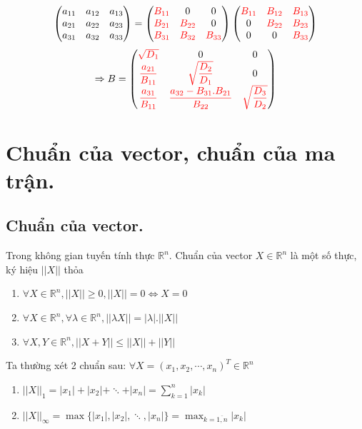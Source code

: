 \documentclass[12pt, a4paper]{report}
\begin{document}
\[
    \begin{pmatrix}
        a_{11} & a_{12} & a_{13} \\
        a_{21} & a_{22} & a_{23} \\
        a_{31} & a_{32} & a_{33} \\
    \end{pmatrix}  = \begin{pmatrix}
        \textcolor{red}{B_{11}} & 0 & 0 \\
        \textcolor{red}{B_{21}} & \textcolor{red}{B_{22}} & 0 \\
        \textcolor{red}{B_{31}} & \textcolor{red}{B_{32}} & \textcolor{red}{B_{33}} \\
    \end{pmatrix} \begin{pmatrix}
        \textcolor{red}{B_{11}} & \textcolor{red}{B_{12}} & \textcolor{red}{B_{13}} \\
        0 & \textcolor{red}{B_{22}} & \textcolor{red}{B_{23}} \\
        0 & 0 & \textcolor{red}{B_{33}} \\
    \end{pmatrix}    
\]
\[
    \Rightarrow B = \begin{pmatrix}
        \textcolor{red}{\sqrt{D_1}} & 0 & 0 \\
        \textcolor{red}{\dfrac{\textcolor{red}{a_{21}}}{\textcolor{red}{B_{11}}}} & \textcolor{red}{\sqrt{\dfrac{D_2}{D_1}}} & 0 \\
        \textcolor{red}{\dfrac{\textcolor{red}{a_{31}}}{\textcolor{red}{B_{11}}}} & \textcolor{red}{\dfrac{\textcolor{red}{a_{32} - B_{31}.B_{21}}}{\textcolor{red}{B_{22}}}} & \textcolor{red}{\sqrt{\dfrac{D_3}{D_2}}}
    \end{pmatrix}    
\]
\section{Chuẩn của vector, chuẩn của ma trận.}
\subsection{Chuẩn của vector.}
Trong không gian tuyến tính thực $\mathbb{R}^n$. Chuẩn của vector $X \in \mathbb{R}^n$ là một số thực, ký hiệu $||X||$ thỏa
\begin{enumerate}
    \item $\forall X \in \mathbb{R}^n, ||X|| \geq 0, ||X|| = 0 \Leftrightarrow X = 0$ 
    \item $\forall X \in \mathbb{R}^n, \forall \lambda \in \mathbb{R}^n, ||\lambda X|| = |\lambda|.||X||$
    \item $\forall X,Y \in \mathbb{R}^n, ||X+Y|| \leq ||X|| + ||Y||$
\end{enumerate}
Ta thường xét 2 chuẩn sau: $\forall X = (x_1,x_2,\cdots,x_n)^T \in \mathbb{R}^n$
    \begin{enumerate}
        \item $||X||_1 = |x_1|+ |x_2| + \ddots + |x_n| = \displaystyle \sum_{k=1}^{n} |x_k|$
        \item $||X||_{\infty} = \max \lbrace |x_1|,|x_2|,\ddots,|x_n| \rbrace = \max_{k=\overline{1,n}} |x_k|$
    \end{enumerate}    
\end{document}
